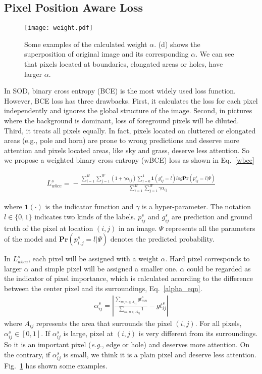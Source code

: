 \documentclass[letterpaper]{article} %
\begin{document}
\subsection{Pixel Position Aware Loss}
\begin{figure}[htb]
  \centering
  \texttt{[image: weight.pdf]}
  \caption{Some examples of the calculated weight $\alpha$. (d) shows the superposition of original image and its corresponding $\alpha$. We can see that pixels located at boundaries, elongated areas or holes, have larger $\alpha$.}
  \label{alpha_fig}
\end{figure}
In SOD, binary cross entropy (BCE) is the most widely used loss function. However, BCE loss has three drawbacks. First, it calculates the loss for each pixel independently and ignores the global structure of the image. Second, in pictures where the background is dominant, loss of foreground pixels will be diluted. Third, it treats all pixels equally. In fact, pixels located on cluttered or elongated areas (e.g., pole and horn) are prone to wrong predictions and deserve more attention and pixels located areas, like sky and grass, deserve less attention. So we propose a weighted binary cross entropy (wBCE) loss as shown in Eq.~\ref{wbce}
\begin{small}
\begin{eqnarray}
  \label{wbce}
  L^s_{wbce}\!=\!-\frac{\sum\limits_{i=1}^H\!\sum\limits_{j=1}^W\!(1\!+\!\gamma\alpha_{ij})\sum\limits_{l=0}^{1}\!\mathbf{1}(g_{ij}^s=l)log\mathbf{Pr}(p_{ij}^s=l|\Psi)}{\sum\limits_{i=1}^H\!\sum\limits_{j=1}^W \gamma\alpha_{ij}}
\end{eqnarray}
\end{small}
where $\mathbf{1(\cdot)}$ is the indicator function and $\gamma$ is a hyper-parameter.  The notation $l \in \{0,1\}$ indicates two kinds of the labels. $p_{ij}^s$ and $g_{ij}^s$ are prediction and ground truth of the pixel at location $(i, j)$ in an image. $\Psi$ represents all the parameters of the model and $\mathbf{Pr}(p_{i,j}^s = l|\Psi)$ denotes the predicted probability.

In $L^s_{wbce}$, each pixel will be assigned with a weight $\alpha$. Hard pixel corresponds to larger $\alpha$ and simple pixel will be assigned a smaller one. $\alpha$ could be regarded as the indicator of pixel importance, which is calculated according to the difference between the center pixel and its surroundings, Eq.~\ref{alpha_eqn}.
\begin{eqnarray}
  \label{alpha_eqn}
  \alpha_{ij}^s = \left|\frac{\sum\limits_{m,n \in A_{ij}}gt^s_{mn}}{\sum\limits_{m,n \in A_{ij}} 1} - gt^s_{ij}\right|
\end{eqnarray}
where $A_{ij}$ represents the area that surrounds the pixel $(i,j)$. For all pixels, $\alpha_{ij}^s \in [0,1]$. If $\alpha_{ij}^s$ is large, pixel at $(i,j)$ is very different from its surroundings. So it is an important pixel ({\it e.g.}, edge or hole) and deserves more attention. On the contrary, if $\alpha_{ij}^s$ is small, we think it is a plain pixel and deserve less attention. Fig.~\ref{alpha_fig} has shown some examples.
\end{document}

